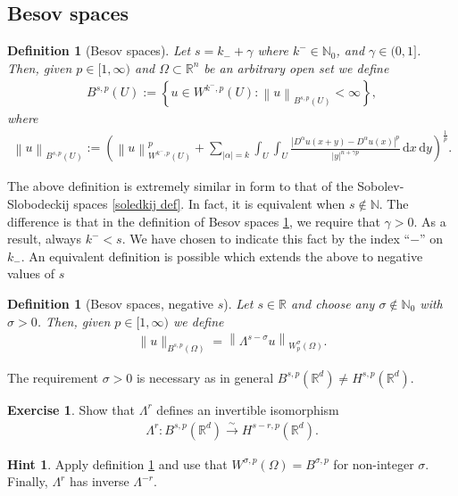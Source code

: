 \documentclass[
    a4paper,
    DIV=14,
    abstract=true,
    numbers=noenddot
]
{scrartcl}
\newtheorem{definition}[theorem]{Definition}
\theoremstyle{definition}
\newtheorem{exercise}{Exercise}
\newtheorem*{hint}{Hint}
\newcommand{\set}[1]{\left\{#1\right\}}
\renewcommand{\norm}[1]{\left\lVert #1 \right\rVert}\renewcommand{\abs}[1]{\left| #1 \right|}
\newcommand{\iso}{\xrightarrow{\sim}}
\renewcommand{\d}{\,\mathrm{d}}\newcommand{\dx}{\,\mathrm{d}x}
\newcommand{\N}{\mathbb{N}}
\newcommand{\R}{\mathbb{R}}
\begin{document}
\subsection{Besov spaces}
\begin{definition}[Besov spaces]\label{besov def}
  Let $s=k_{-}+\gamma$ where $k^{-} \in \N_0$, and $\gamma \in (0,1]$. Then, given  $p \in [1,\infty)$ and $\Omega  \subset \R^n$ be an arbitrary open set we define
  \begin{align*}
    B^{s ,p}(U):= \set{u \in W^{k^{-} ,p}(U): \norm{u}_{B^{s,p}(U)}<\infty},
  \end{align*}
  where
  \begin{align*}
    \norm{u}_{B^{s,p}(U)}:= \left(\norm{u}_{W^{k^{-},p}(U)}^p+ \sum_{\abs{\alpha}=k }\int_{U}\int_{U}\frac{\abs{D^\alpha u(x+y)-D^\alpha u(x)}^p}{\abs{y}^{n+\gamma p}}\d x \d y\right)^\frac{1}{p}.
  \end{align*}
\end{definition}
The above definition is extremely similar in form to that of the Sobolev-Slobodeckij spaces \ref{soledkij def}. In fact, it is equivalent when $s \notin \N$. The difference is that in the definition of Besov spaces \ref{besov def}, we require that $\gamma >0$. As a result, always $k^{-}<s$. We have chosen to indicate this fact by the index ``$-$'' on $k_{-}$. An equivalent definition is possible which extends the above to negative values of $s$
\begin{definition}[Besov spaces, negative $s$]\label{besov def negative}
  Let $s \in \R$ and choose any $\sigma \not\in \N_0$ with $\sigma >0$. Then, given  $p \in [1,\infty)$ we define
  \begin{align*}
    \|u\|_{B^{s,p}(\Omega)}=\left\|\Lambda^{s-\sigma} u\right\|_{W_p^\sigma(\Omega)}.
  \end{align*}
\end{definition}
The requirement $\sigma >0$ is necessary as in general $B^{s,p}(\R^d)\neq H^{s,p}(\R^d)$.
\begin{exercise}
  Show that $\Lambda ^r$ defines an invertible isomorphism
  \begin{align*}
    \Lambda ^r: B^{s,p}(\R^d)\iso H^{s-r,p}(\R^d).
  \end{align*}
\end{exercise}
\begin{hint}
  Apply definition \ref{besov def negative} and use that $W^{\sigma,p}(\Omega )= B^{\sigma,p } $ for non-integer $\sigma$. Finally,   $\Lambda^r$ has inverse $\Lambda^{-r}$.
\end{hint}
\end{document}
